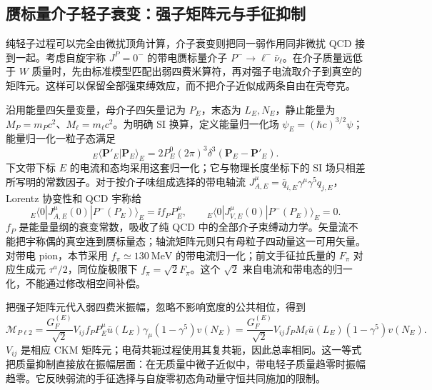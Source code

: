 \subsection{赝标量介子轻子衰变：强子矩阵元与手征抑制}
\label{sec:sm-pseudoscalar-decay-applications}

纯轻子过程可以完全由微扰顶角计算，介子衰变则把同一弱作用同非微扰 QCD 接到一起。考虑自旋宇称 $J^P=0^-$ 的带电赝标量介子 $P^-\to\ell^-\bar\nu_\ell$。在介子质量远低于 $W$ 质量时，先由标准模型匹配出弱四费米算符，再对强子电流取介子到真空的矩阵元。这样可以保留全部强束缚效应，而不把介子近似成两条自由在壳夸克。

沿用能量四矢量变量，母介子四矢量记为 $P_E$，末态为 $L_E,N_E$，静止能量为 $M_P=m_Pc^2$、$M_\ell=m_\ell c^2$。为明确 SI 换算，定义能量归一化场 $\psi_E=(\hbar c)^{3/2}\psi$；能量归一化一粒子态满足
\begin{equation*}
 {}_E\langle\mathbf P'_E|\mathbf P_E\rangle_E
 =2P_E^0(2\pi)^3\delta^3(\mathbf P_E-\mathbf P'_E).
\end{equation*}
下文带下标 $E$ 的电流和态均采用这套归一化；它与物理长度坐标下的 SI 场只相差所写明的常数因子。对于按介子味组成选择的带电轴流 $J_{A,E}^\mu=\bar q_{i,E}\gamma^\mu\gamma^5q_{j,E}$，Lorentz 协变性和 QCD 宇称给
\begin{equation}
 {}_E\langle0|J_{A,E}^\mu(0)|P^-(P_E)\rangle_E
 =\ii f_P P_E^\mu,\qquad
 {}_E\langle0|J_{V,E}^\mu(0)|P^-(P_E)\rangle_E=0.
 \label{eq:sm-pseudoscalar-axial-definition}
\end{equation}
$f_P$ 是能量量纲的衰变常数，吸收了纯 QCD 中的全部介子束缚动力学。矢量流不能把宇称偶的真空连到赝标量态；轴流矩阵元则只有母粒子四动量这一可用矢量。对带电 pion，本节采用 $f_\pi\simeq\SI{130}{\mega\electronvolt}$ 的带电流归一化；前文手征拉氏量的 $F_\pi$ 对应生成元 $\tau^a/2$，同位旋极限下 $f_\pi=\sqrt2F_\pi$。这个 $\sqrt2$ 来自电流和带电态的归一化，不能通过修改相空间补偿\cite{Briere2024Pseudoscalar}。

把强子矩阵元代入弱四费米振幅，忽略不影响宽度的公共相位，得到
\begin{equation}
 \mathcal M_{P\ell2}
 =\frac{G_F^{(E)}}{\sqrt2}V_{ij}f_P
 P_E^\mu\bar u(L_E)\gamma_\mu(1-\gamma^5)v(N_E)
 =\frac{G_F^{(E)}}{\sqrt2}V_{ij}f_PM_\ell
 \bar u(L_E)(1-\gamma^5)v(N_E).
 \label{eq:sm-pseudoscalar-amplitude}
\end{equation}
$V_{ij}$ 是相应 CKM 矩阵元；电荷共轭过程使用其复共轭，因此总率相同。这一等式把质量抑制直接放在振幅层面：在无质量中微子近似中，带电轻子质量趋零时振幅趋零。它反映弱流的手征选择与自旋零初态角动量守恒共同施加的限制。

